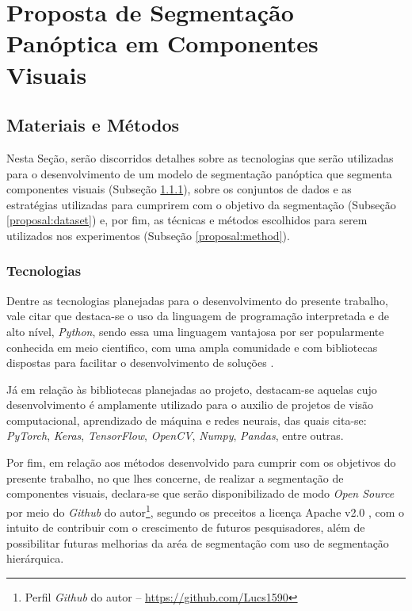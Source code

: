 \newpage
\clearpage
\section{Proposta de Segmentação Panóptica em Componentes Visuais}
\label{proposal:proposal}


\subsection{Materiais e Métodos}
\label{proposal:matmet}
Nesta Seção, serão discorridos detalhes sobre as tecnologias que serão utilizadas para o desenvolvimento de um modelo de segmentação panóptica que segmenta componentes visuais (Subseção \ref{proposal:tec}), sobre os conjuntos de dados e as estratégias utilizadas para cumprirem com o objetivo da segmentação (Subseção \ref{proposal:dataset}) e, por fim, as técnicas e métodos escolhidos para serem utilizados nos experimentos (Subseção \ref{proposal:method}).


\subsubsection{Tecnologias}
\label{proposal:tec}

Dentre as tecnologias planejadas para o desenvolvimento do presente trabalho, vale citar que destaca-se o uso da linguagem de programação interpretada e de alto nível, \textit{Python}, sendo essa uma linguagem vantajosa por ser popularmente conhecida em meio cientifico, com uma ampla comunidade e com  bibliotecas dispostas para facilitar o desenvolvimento de soluções \cite{Millman2011PythonEngineers}.

Já em relação às bibliotecas planejadas ao projeto, destacam-se aquelas cujo desenvolvimento é amplamente utilizado para o auxilio de projetos de visão computacional, aprendizado de máquina e redes neurais, das quais cita-se: \textit{PyTorch}, \textit{Keras}, \textit{TensorFlow}, \textit{OpenCV}, \textit{Numpy}, \textit{Pandas}, entre outras.

Por fim, em relação aos métodos desenvolvido para cumprir com os objetivos do presente trabalho, no que lhes concerne, de realizar a segmentação de componentes visuais, declara-se que serão disponibilizado de modo \textit{Open Source} por meio do \textit{Github} do autor\footnote{Perfil \textit{Github} do autor – \url{https://github.com/Lucs1590}}, segundo os preceitos a licença Apache v2.0 \cite{Licenses}, com o intuito de contribuir com o crescimento de futuros pesquisadores, além de possibilitar futuras melhorias da aréa de segmentação com uso de segmentação hierárquica.


